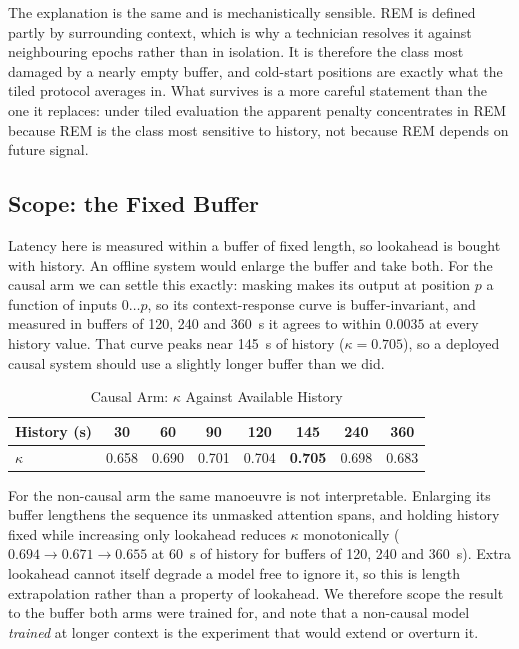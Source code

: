 \documentclass[conference]{IEEEtran}
\begin{document}
The explanation is the same and is mechanistically sensible. REM is defined partly by surrounding
context, which is why a technician resolves it against neighbouring epochs rather than in isolation.
It is therefore the class most damaged by a nearly empty buffer, and cold-start positions are
exactly what the tiled protocol averages in. What survives is a more careful statement than the one
it replaces: under tiled evaluation the apparent penalty concentrates in REM because REM is the
class most sensitive to history, not because REM depends on future signal.

\subsection{Scope: the Fixed Buffer}

Latency here is measured within a buffer of fixed length, so lookahead is bought with history. An
offline system would enlarge the buffer and take both. For the causal arm we can settle this
exactly: masking makes its output at position $p$ a function of inputs $0 \ldots p$, so its
context-response curve is buffer-invariant, and measured in buffers of 120, 240 and 360~s it agrees
to within $0.0035$ at every history value. That curve peaks near 145~s of history
($\kappa = 0.705$), so a deployed causal system should use a slightly longer buffer than we did.

\begin{table}[t]
\caption{Causal Arm: $\kappa$ Against Available History}
\label{tab:context}
\centering
\footnotesize
\setlength{\tabcolsep}{3.4pt}
\begin{tabular}{lccccccc}
\toprule
History (s) & 30 & 60 & 90 & 120 & \textbf{145} & 240 & 360 \\
\midrule
$\kappa$ & 0.658 & 0.690 & 0.701 & 0.704 & \textbf{0.705} & 0.698 & 0.683 \\
\bottomrule
\end{tabular}
\end{table}

For the non-causal arm the same manoeuvre is not interpretable. Enlarging its buffer lengthens the
sequence its unmasked attention spans, and holding history fixed while increasing only lookahead
reduces $\kappa$ monotonically ($0.694 \to 0.671 \to 0.655$ at 60~s of history for buffers of 120,
240 and 360~s). Extra lookahead cannot itself degrade a model free to ignore it, so this is length
extrapolation rather than a property of lookahead. We therefore scope the result to the buffer both
arms were trained for, and note that a non-causal model \emph{trained} at longer context is the
experiment that would extend or overturn it.
\end{document}
